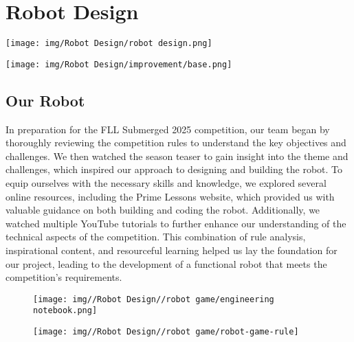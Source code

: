 \newpage












\newpage
\chapter{Robot Design}

\vfill 

\begin{center}
    \texttt{[image: img/Robot Design/robot design.png]}
    \\ 
    
    \vspace{1cm} 

    \texttt{[image: img/Robot Design/improvement/base.png]} 
    \\ 
\end{center}

\vfill 



\newpage
\section{Our Robot}

In preparation for the FLL Submerged 2025 competition, our team began by thoroughly reviewing the competition rules to understand the key objectives and challenges. We then watched the season teaser to gain insight into the theme and challenges, which inspired our approach to designing and building the robot. To equip ourselves with the necessary skills and knowledge, we explored several online resources, including the Prime Lessons website, which provided us with valuable guidance on both building and coding the robot. Additionally, we watched multiple YouTube tutorials to further enhance our understanding of the technical aspects of the competition. This combination of rule analysis, inspirational content, and resourceful learning helped us lay the foundation for our project, leading to the development of a functional robot that meets the competition’s requirements.



\begin{figure}[h!]
    \centering
    \begin{minipage}{0.45\textwidth}
        \centering
        \texttt{[image: img//Robot Design//robot game/engineering notebook.png]}
       
    \end{minipage}
    \hfill
    \begin{minipage}{0.45\textwidth}
        \centering
        \texttt{[image: img//Robot Design//robot game/robot-game-rule]}
       
    \end{minipage}
\end{figure}


